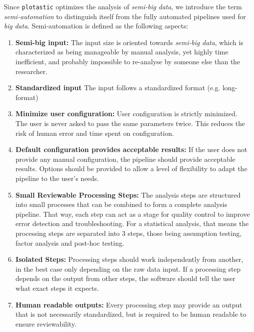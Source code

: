 Since \texttt{plotastic} optimizes the analysis of \textit{semi-big data}, we
introduce the term \textit{semi-automation} to distinguish itself from the fully
automated pipelines used for \textit{big data}. Semi-automation is
defined as the following aspects:
\begin{enumerate}
      \item \textbf{Semi-big input:} The input size is oriented towards
            \textit{semi-big data}, which is characterized as being manageable by
            manual analysis, yet highly time inefficient, and probably impossible
            to re-analyse by someone else than the researcher.
      \item \textbf{Standardized input} The input follows a standardized format (e.g. long-format)
      \item \textbf{Minimize user configuration:} User configuration is strictly
            minimized. The user is never asked to pass the same parameters twice. This
            reduces the risk of human error and time spent on configuration.
      \item \textbf{Default configuration provides acceptable results:} If the
            user does not provide any manual configuration, the pipeline should
            provide acceptable results. Options should be provided to allow a
            level of flexibility to adapt the pipeline to the user's needs.
      \item \textbf{Small Reviewable Processing Steps:} The analysis steps are
            structured into small processes that can be combined to form a
            complete analysis pipeline. That way, each step can act as a stage for
            quality control to improve error detection and troubleshooting. For a
            statistical analysis, that means the processing steps are separated
            into 3 steps, those being assumption testing, factor analysis and
            post-hoc testing.
      \item \textbf{Isolated Steps:} Processing steps should work independently
            from another, in the best case only depending on the raw data input.
            If a processing step depends on the output from other steps, the
            software should tell the user what exact steps it expects.
      \item \textbf{Human readable outputs:} Every processing step may provide
            an output that is not necessarily standardized, but is required to be
            human readable to ensure reviewability.

\end{enumerate}

